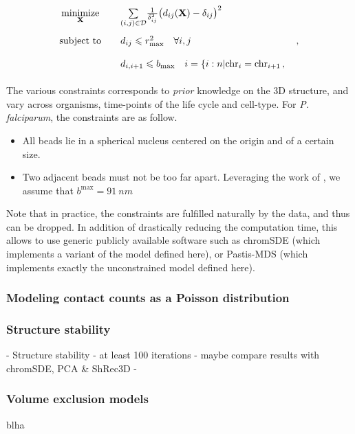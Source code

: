 \documentclass[oupdraft]{bio}
\begin{document}
\begin{equation}\label{eq:mds1} 
\renewcommand{\arraystretch}{2} 
\begin{array}{ccll} 
\underset{\mathbf{X}}{\text{minimize}} & & 
\underset{(i,j) \in \mathcal{D}}{\sum} \frac{1}{\delta^2_{ij}}
\big(d_{ij}(\mathbf{X}) - \delta_{ij}\big)^2 & \\
\text{subject to} & & d_{ij} \leq r^2_\text{max} \quad \forall i, j &\,,\\
& & d_{i, i+1} \leq b_\text{max} \quad i = \{i:n|\text{chr}_i = \text{chr}_{i+1}\,,&\\ 
\end{array} 
\end{equation}

The various constraints corresponds to {\em prior} knowledge on the 3D
structure, and vary across organisms, time-points of the life cycle and
cell-type. For {\em P. falciparum}, the constraints are as follow.

\begin{itemize}
\item All beads lie in a spherical nucleus centered on the origin and of a
certain size.
\item Two adjacent beads must not be too far apart. Leveraging the work of
\citet{berger:high TOVERIFY}, we assume that $b^\text{max} = 91~nm$
\end{itemize}

Note that in practice, the constraints are fulfilled naturally by the data,
and thus can be dropped. In addition of drastically reducing the computation
time, this allows to use generic publicly available software such as chromSDE
(which implements a variant of the model defined here), or Pastis-MDS (which
implements exactly the unconstrained model defined here).

\subsubsection{Modeling contact counts as a Poisson distribution}



\subsubsection{Structure stability}
- Structure stability
- at least 100 iterations
- maybe compare results with chromSDE, PCA \& ShRec3D 
- 

\subsubsection{Volume exclusion models}
blha
\end{document}
